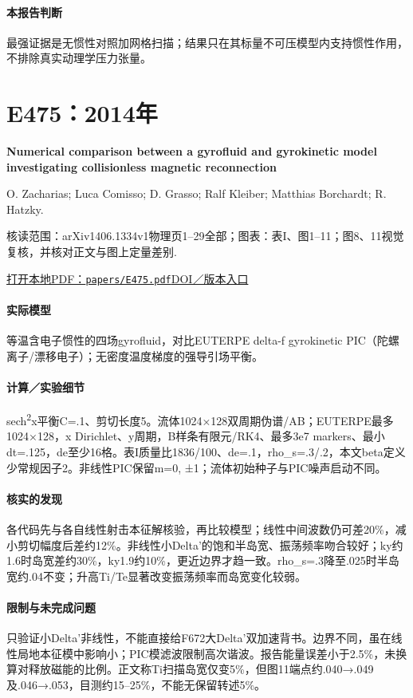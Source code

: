 \paragraph{本报告判断}最强证据是无惯性对照加网格扫描；结果只在其标量不可压模型内支持惯性作用，不排除真实动理学压力张量。

\section{E475：2014年}\label{paper:E475}

\textbf{Numerical comparison between a gyrofluid and gyrokinetic model investigating collisionless magnetic reconnection}\citep{E475}\

O. Zacharias;  Luca Comisso;  D. Grasso;  Ralf Kleiber;  Matthias Borchardt;  R. Hatzky.

\textsf{核读范围：}arXiv1406.1334v1物理页1–29全部；\textsf{图表：}表I、图1–11；图8、11视觉复核，并核对正文与图上定量差别.

\href{run:papers/E475.pdf}{打开本地PDF：\texttt{papers/E475.pdf}}\quad\href{https://doi.org/10.1063/1.4882679}{DOI／版本入口}

\paragraph{实际模型}等温含电子惯性的四场gyrofluid，对比EUTERPE delta-f gyrokinetic PIC（陀螺离子/漂移电子）；无密度温度梯度的强导引场平衡。

\paragraph{计算／实验细节}sech\textsuperscript{2}x平衡C=.1、剪切长度5。流体1024×128双周期伪谱/AB；EUTERPE最多1024×128，x Dirichlet、y周期，B样条有限元/RK4、最多3e7 markers、最小dt=.125，de至少16格。表I质量比1836/100、de=.1，rho\_s=.3/.2，本文beta定义少常规因子2。非线性PIC保留m=0, ±1；流体初始种子与PIC噪声启动不同。

\paragraph{核实的发现}各代码先与各自线性射击本征解核验，再比较模型；线性中间波数仍可差20\%，减小剪切幅度后差约12\%。非线性小Delta'的饱和半岛宽、振荡频率吻合较好；ky约1.6时岛宽差约30\%，ky1.9约10\%，更近边界才趋一致。rho\_s=.3降至.025时半岛宽约.04不变；升高Ti/Te显著改变振荡频率而岛宽变化较弱。

\paragraph{限制与未完成问题}只验证小Delta'非线性，不能直接给F672大Delta'双加速背书。边界不同，虽在线性局地本征模中影响小；PIC模滤波限制高次谐波。报告能量误差小于2.5\%，未换算对释放磁能的比例。正文称Ti扫描岛宽仅变5\%，但图11端点约.040→.049及.046→.053，目测约15–25\%，不能无保留转述5\%。

